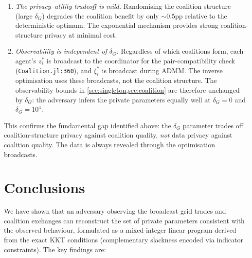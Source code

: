 \documentclass[11pt,a4paper]{article}
\newcommand{\ce}{\xi}
\begin{document}
\begin{enumerate}[nosep]
    \item \emph{The privacy--utility tradeoff is mild.} Randomising the coalition structure (large $\delta_G$) degrades the coalition benefit by only $\sim$0.5pp relative to the deterministic optimum. The exponential mechanism provides strong coalition-structure privacy at minimal cost.
    \item \emph{Observability is independent of $\delta_G$.} Regardless of which coalitions form, each agent's $z_i^*$ is broadcast to the coordinator for the pair-compatibility check (\texttt{Coalition.jl:360}), and $\ce_i^*$ is broadcast during ADMM. The inverse optimisation uses these broadcasts, not the coalition structure. The observability bounds in \cref{sec:singleton,sec:coalition} are therefore unchanged by $\delta_G$: the adversary infers the private parameters equally well at $\delta_G=0$ and $\delta_G=10^4$.
\end{enumerate}

This confirms the fundamental gap identified above: the $\delta_G$ parameter trades off coalition-structure privacy against coalition quality, \emph{not} data privacy against coalition quality. The data is always revealed through the optimisation broadcasts.

\section{Conclusions}\label{sec:conclusions}

We have shown that an adversary observing the broadcast grid trades and coalition exchanges can reconstruct the set of private parameters consistent with the observed behaviour, formulated as a mixed-integer linear program derived from the exact KKT conditions (complementary slackness encoded via indicator constraints). The key findings are:
\end{document}
